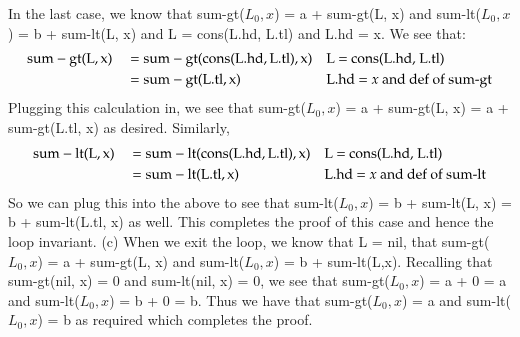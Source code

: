 \documentclass[12pt]{article}
\theoremstyle{definitionstyle}
\begin{document}
\begin{enumerate}[labelindent=0pt, labelwidth=!, wide]
            In the last case, we know that sum-gt($L_0, x$) = a + sum-gt(L, x) and sum-lt($L_0, x$) = b + sum-lt(L, x) and L = cons(L.hd, L.tl) and L.hd = x. We see that:
            \begin{align*}
                \begin{aligned}
                    &\rm sum-gt(L, x) &&= \rm sum-gt(cons(L.hd, L.tl), x) &&\text{\rm L = cons(L.hd, L.tl)} \\
                    &&&= \rm sum-gt(L.tl, x) &&\text{L.hd $=x$ and def of sum-gt}
                \end{aligned}
            \end{align*}
            Plugging this calculation in, we see that sum-gt($L_0, x$) = a + sum-gt(L, x) = a + sum-gt(L.tl, x) as desired.  Similarly,
            \begin{align*}
                \begin{aligned}
                    &\rm sum-lt(L, x) &&= \rm sum-lt(cons(L.hd, L.tl), x) &&\text{\rm L = cons(L.hd, L.tl)} \\
                    &&&= \rm sum-lt(L.tl, x) &&\text{L.hd $=x$ and def of sum-lt}
                \end{aligned}
            \end{align*}
            So we can plug this into the above to see that sum-lt($L_0, x$) = b + sum-lt(L, x) = b + sum-lt(L.tl, x) as well. This completes the proof of this case and hence the loop invariant.
            \newline 
            \newline
            (c) When we exit the loop, we know that L = nil, that sum-gt($L_0, x$) = a + sum-gt(L, x) and sum-lt($L_0, x$) = b + sum-lt(L,x). Recalling that sum-gt(nil, x) = 0 and sum-lt(nil, x) = 0, we see that sum-gt($L_0, x$) = a + 0 = a and sum-lt($L_0, x$) = b + 0 = b. Thus we have that sum-gt($L_0, x$) = a and sum-lt($L_0, x$) = b as required which completes the proof.


\end{enumerate}
\end{document}
